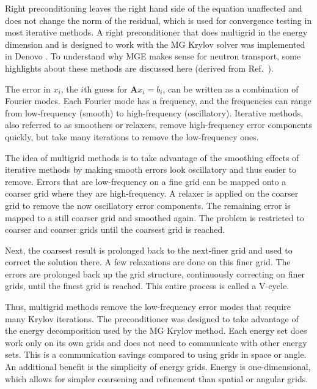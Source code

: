 \documentclass{article}                                                                           %
\newcommand{\ve}[1]{\ensuremath{\mathbf{#1}}}
\begin{document}
Right preconditioning leaves the right hand side of the equation unaffected and does not change the norm of the residual, which is used for convergence testing in most iterative methods. A right preconditioner that does multigrid in the energy dimension and is designed to work with the MG Krylov solver was implemented in Denovo \cite{Slaybaugh2013}. To understand why MGE makes sense for neutron transport, some highlights about these methods are discussed here (derived from Ref.\ \cite{Briggs2000}). 

The error in $x_i$, the $i$th guess for $\ve{A}x_i=b_i$, can be written as a combination of Fourier modes. Each Fourier mode has a frequency, and the frequencies can range from low-frequency (smooth) to high-frequency (oscillatory). Iterative methods, also referred to as smoothers or relaxers, remove high-frequency error components quickly, but take many iterations to remove the low-frequency ones. 

The idea of multigrid methods is to take advantage of the smoothing effects of iterative methods by making smooth errors look oscillatory and thus easier to remove. Errors that are low-frequency on a fine grid can be mapped onto a coarser grid where they are high-frequency. A relaxer is applied on the coarser grid to remove the now oscillatory error components. The remaining error is mapped to a still coarser grid and smoothed again. The problem is restricted to coarser and coarser grids until the coarsest grid is reached.%

Next, the coarsest result is prolonged back to the next-finer grid and used to correct the solution there. A few relaxations are done on this finer grid. The errors are prolonged back up the grid structure, continuously correcting on finer grids, until the finest grid is reached. This entire process is called a V-cycle. %
 
Thus, multigrid methods remove the low-frequency error modes that require many Krylov iterations. The preconditioner was designed to take advantage of the energy decomposition used by the MG Krylov method. Each energy set does work only on its own grids and does not need to communicate with other energy sets. This is a communication savings compared to using grids in space or angle. An additional benefit is the simplicity of energy grids. Energy is one-dimensional, which allows for simpler coarsening and refinement than spatial or angular grids.
\end{document}
